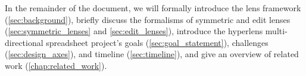 In the remainder of the document, we will formally introduce the lens
framework (\ref{sec:background}), briefly discuss the formalisms of
symmetric and edit lenses (\ref{sec:symmetric_lenses} and
\ref{sec:edit_lenses}), introduce the hyperlens multi-directional
spreadsheet project's goals (\ref{sec:goal_statement}), challenges
(\ref{sec:design_axes}), and timeline (\ref{sec:timeline}), and give an
overview of related work (\ref{chap:related_work}).
